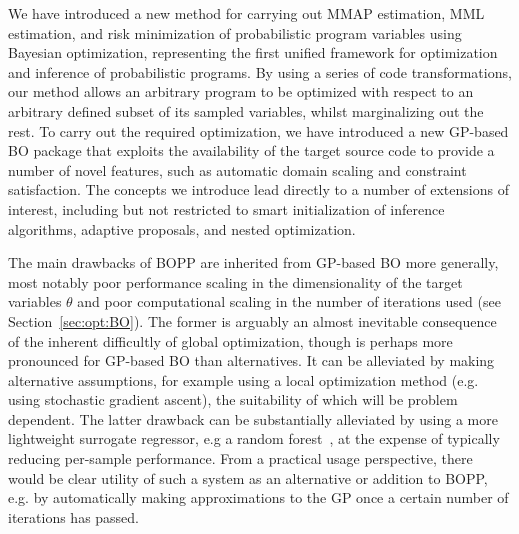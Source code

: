 
We have introduced a new method for carrying out MMAP estimation, MML estimation, and risk minimization
of probabilistic program variables using Bayesian optimization, representing the first unified framework for 
optimization and inference of probabilistic programs.  By using a series of code transformations, 
our method allows an arbitrary program to be optimized with respect to an arbitrary defined subset of its sampled variables, 
whilst marginalizing out the rest.  To carry out the required optimization, we have introduced a new GP-based 
BO package that exploits the availability of the target source code to provide a number of novel features, 
such as automatic domain scaling and constraint satisfaction.  
The concepts we introduce lead directly to a number of extensions of interest, including but not restricted 
to smart initialization of inference algorithms, adaptive proposals, and nested optimization.

The main drawbacks of BOPP are inherited from GP-based BO more generally,
most notably poor performance scaling in the dimensionality of the target variables $\theta$ and poor 
computational scaling in the number of iterations used (see Section~\ref{sec:opt:BO}).  The former is 
arguably an almost inevitable consequence of the inherent difficultly of global optimization, though is perhaps
more pronounced for GP-based BO than alternatives.  It can be alleviated by making alternative
assumptions, for example using a local optimization method (e.g. using stochastic gradient ascent), the
suitability of which will be problem dependent.  The latter drawback can be substantially alleviated by using
a more lightweight surrogate regressor, e.g a random forest~\citep{hutter2011sequential}, 
at the expense of typically reducing per-sample performance.  From
a practical usage perspective, there would be clear utility of such a system as an alternative or addition to BOPP, e.g. by automatically
making approximations to the GP once a certain number of iterations has passed.

